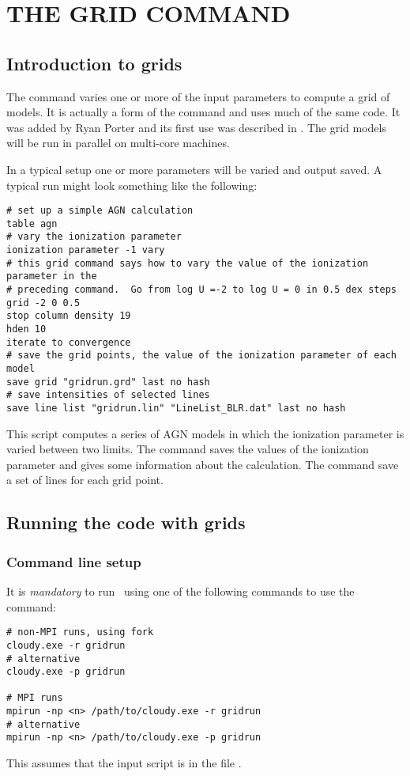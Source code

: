 \chapter{THE GRID COMMAND}
\label{sec:CommandGrid}

\section{Introduction to grids}

The  command varies one or more of the input parameters
to compute a grid of models.
It is actually a form of the  command and uses much
of the same code.
It was added by Ryan Porter and its first use was
described in \citet{Porter2006}.
The grid models will be run in parallel on multi-core machines.

In a typical setup one or more parameters will be varied and output saved.
A typical  run might look something like the following:
\begin{verbatim}
# set up a simple AGN calculation
table agn
# vary the ionization parameter
ionization parameter -1 vary
# this grid command says how to vary the value of the ionization parameter in the
# preceding command.  Go from log U =-2 to log U = 0 in 0.5 dex steps
grid -2 0 0.5
stop column density 19
hden 10
iterate to convergence
# save the grid points, the value of the ionization parameter of each model
save grid "gridrun.grd" last no hash
# save intensities of selected lines
save line list "gridrun.lin" "LineList_BLR.dat" last no hash
\end{verbatim}

This script computes a series of AGN models in which the ionization parameter
is varied between two limits.
The  command saves the values of the ionization parameter
and gives some information about the calculation.
The  command save a set of lines for each grid point.

\section{Running the code with grids}

\subsection{Command line setup}
It is {\em mandatory} to run \Cloudy\ using one of the
following commands to use the  command:
%
\begin{verbatim}
# non-MPI runs, using fork
cloudy.exe -r gridrun
# alternative
cloudy.exe -p gridrun

# MPI runs
mpirun -np <n> /path/to/cloudy.exe -r gridrun
# alternative
mpirun -np <n> /path/to/cloudy.exe -p gridrun
\end{verbatim}
This assumes that the input script is in the file . 


